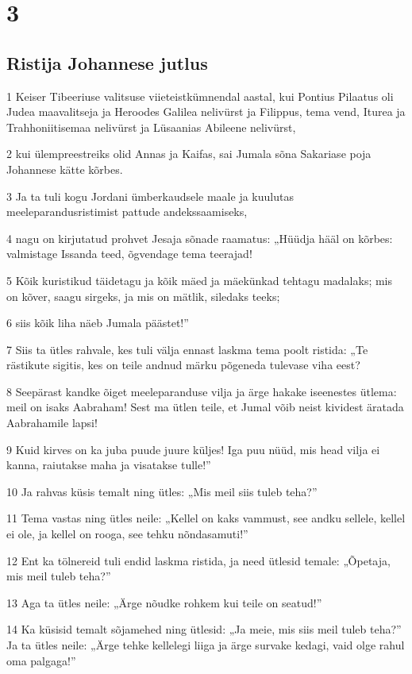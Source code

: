 \chapter{3}

\section*{Ristija Johannese jutlus}

\par 1 Keiser Tibeeriuse valitsuse viieteistkümnendal aastal, kui Pontius Pilaatus oli Judea maavalitseja ja Heroodes Galilea nelivürst ja Filippus, tema vend, Iturea ja Trahhoniitisemaa nelivürst ja Lüsaanias Abileene nelivürst,
\par 2 kui ülempreestreiks olid Annas ja Kaifas, sai Jumala sõna Sakariase poja Johannese kätte kõrbes.
\par 3 Ja ta tuli kogu Jordani ümberkaudsele maale ja kuulutas meeleparandusristimist pattude andekssaamiseks,
\par 4 nagu on kirjutatud prohvet Jesaja sõnade raamatus: „Hüüdja hääl on kõrbes: valmistage Issanda teed, õgvendage tema teerajad!
\par 5 Kõik kuristikud täidetagu ja kõik mäed ja mäekünkad tehtagu madalaks; mis on kõver, saagu sirgeks, ja mis on mätlik, siledaks teeks;
\par 6 siis kõik liha näeb Jumala päästet!”
\par 7 Siis ta ütles rahvale, kes tuli välja ennast laskma tema poolt ristida: „Te rästikute sigitis, kes on teile andnud märku põgeneda tulevase viha eest?
\par 8 Seepärast kandke õiget meeleparanduse vilja ja ärge hakake iseenestes ütlema: meil on isaks Aabraham! Sest ma ütlen teile, et Jumal võib neist kividest äratada Aabrahamile lapsi!
\par 9 Kuid kirves on ka juba puude juure küljes! Iga puu nüüd, mis head vilja ei kanna, raiutakse maha ja visatakse tulle!”
\par 10 Ja rahvas küsis temalt ning ütles: „Mis meil siis tuleb teha?”
\par 11 Tema vastas ning ütles neile: „Kellel on kaks vammust, see andku sellele, kellel ei ole, ja kellel on rooga, see tehku nõndasamuti!”
\par 12 Ent ka tölnereid tuli endid laskma ristida, ja need ütlesid temale: „Õpetaja, mis meil tuleb teha?”
\par 13 Aga ta ütles neile: „Ärge nõudke rohkem kui teile on seatud!”
\par 14 Ka küsisid temalt sõjamehed ning ütlesid: „Ja meie, mis siis meil tuleb teha?” Ja ta ütles neile: „Ärge tehke kellelegi liiga ja ärge survake kedagi, vaid olge rahul oma palgaga!”
